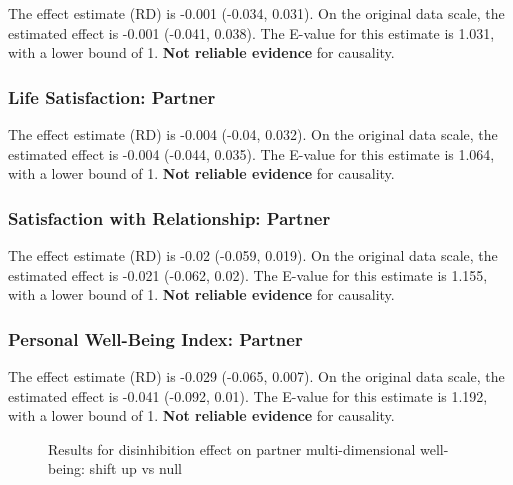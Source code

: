 \documentclass[
  singlecolumn]{article}
\begin{document}
The effect estimate (RD) is -0.001 (-0.034, 0.031). On the original data
scale, the estimated effect is -0.001 (-0.041, 0.038). The E-value for
this estimate is 1.031, with a lower bound of 1. \textbf{Not reliable
evidence} for causality.

\subsubsection{Life Satisfaction:
Partner}\label{life-satisfaction-partner-1}

The effect estimate (RD) is -0.004 (-0.04, 0.032). On the original data
scale, the estimated effect is -0.004 (-0.044, 0.035). The E-value for
this estimate is 1.064, with a lower bound of 1. \textbf{Not reliable
evidence} for causality.

\subsubsection{Satisfaction with Relationship:
Partner}\label{satisfaction-with-relationship-partner-1}

The effect estimate (RD) is -0.02 (-0.059, 0.019). On the original data
scale, the estimated effect is -0.021 (-0.062, 0.02). The E-value for
this estimate is 1.155, with a lower bound of 1. \textbf{Not reliable
evidence} for causality.

\subsubsection{Personal Well-Being Index:
Partner}\label{personal-well-being-index-partner-1}

The effect estimate (RD) is -0.029 (-0.065, 0.007). On the original data
scale, the estimated effect is -0.041 (-0.092, 0.01). The E-value for
this estimate is 1.192, with a lower bound of 1. \textbf{Not reliable
evidence} for causality.

\begin{figure}


\caption{\label{fig-results-disinhibition-partner-up}Results for
disinhibition effect on partner multi-dimensional well-being: shift up
vs null}

\end{figure}%
\end{document}
